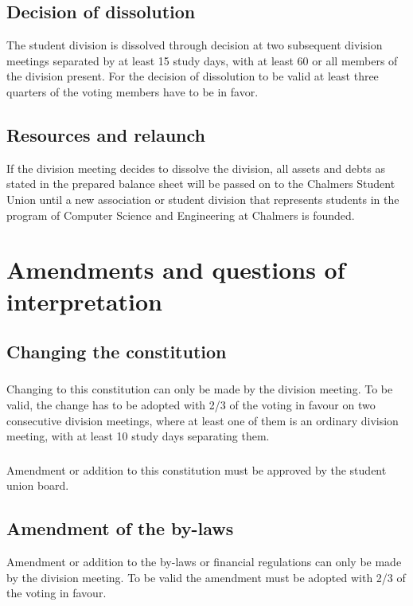 \documentclass[a4paper]{dtek}
\begin{document}
\subsection{Decision of dissolution}
The student division is dissolved through decision at two subsequent division meetings separated by at least 15 study days, with at least 60 or all members of the division present. For the decision of dissolution to be valid at least three quarters of the voting members have to be in favor. 


\subsection{Resources and relaunch}
If the division meeting decides to dissolve the division, all assets and debts as stated in the prepared balance sheet will be passed on to the Chalmers Student Union until a new association or student division that represents students in the program of Computer Science and Engineering at Chalmers is founded.

\newpage

\section{Amendments and questions of interpretation}
\subsection{Changing the constitution}
\subsubsection{}
Changing to this constitution can only be made by the division meeting. To be valid, the change has to be adopted with 2/3 of the voting in favour on two consecutive division meetings, where at least one of them is an ordinary division meeting, with at least 10 study days separating them. 

\subsubsection{}
Amendment or addition to this constitution must be approved by the student union board. 

\subsection{Amendment of the by-laws}
Amendment or addition to the by-laws or financial regulations can only be made by the division meeting. To be valid the amendment must be adopted with 2/3 of the voting in favour. 
\end{document}
